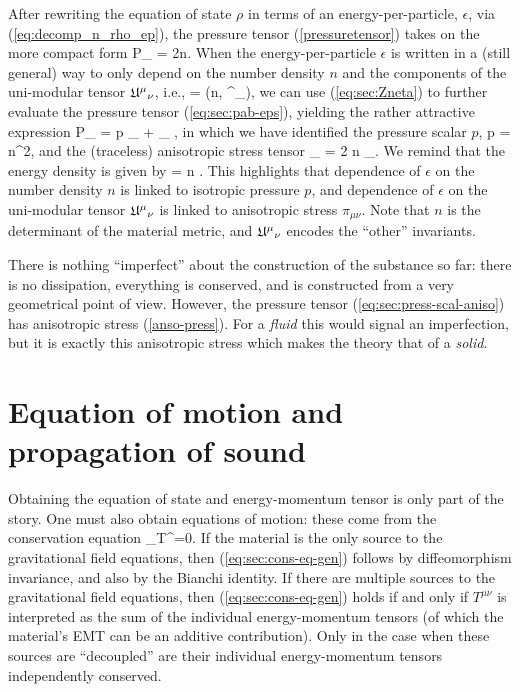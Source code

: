 

After rewriting the equation of state $\rho$ in terms of an energy-per-particle, $\epsilon$, via (\ref{eq:decomp_n_rho_ep}),  the pressure tensor (\ref{pressuretensor}) takes on  the more compact form
\bea
\label{eq:sec:pab-eps}
P_{\mu\nu} = 2n.
\eea
When the energy-per-particle $\epsilon$ is written in a (still general) way to only depend on the number density $n$ and the components of the  uni-modular tensor ${\mathfrak{U}^{\mu}}_{\nu}$, i.e., 
\bea
\epsilon = \epsilon(n, {\unimod^{\mu}}_{\nu}),
\eea
we can use (\ref{eq:sec:Zneta}) to further evaluate the pressure tensor (\ref{eq:sec:pab-eps}), yielding the rather attractive expression
\bea
\label{eq:sec:press-scal-aniso}
P_{\mu\nu} = p \gamma_{\mu\nu} + \pi_{\mu\nu} ,
\eea
in which  we have identified the pressure scalar $p$,
\bse
\bea
\label{iso-ess}
p = n^2,
\eea
and the (traceless) anisotropic stress tensor
\bea
\label{anso-press}
\pi_{\mu\nu} = 2 n \unimod_{\alpha\langle \mu}\pd{\epsilon}{{\unimod^{\nu\rangle}}_\alpha}.
\eea
We remind that the energy density is given by
\bea
\rho = n \epsilon.
\eea
\ese
This highlights that dependence of $\epsilon$ on the number density $n$ is linked to isotropic pressure $p$, and dependence of $\epsilon$ on the uni-modular tensor ${\mathfrak{U}^{\mu}}_{\nu}$ is linked to anisotropic stress $\pi_{\mu\nu}$. Note that $n$ is the determinant of the material metric, and ${\mathfrak{U}^{\mu}}_{\nu}$ encodes the ``other'' invariants.

There is nothing ``imperfect'' about the construction of the substance so far: there is no dissipation,   everything is conserved, and is constructed from a very geometrical point of view. However, the pressure tensor (\ref{eq:sec:press-scal-aniso}) has anisotropic stress (\ref{anso-press}). For a \textit{fluid} this would signal an imperfection, but it is exactly this anisotropic stress which makes the theory  that of a  \textit{solid}.




\section{Equation of motion and propagation of sound}
Obtaining the equation of state and energy-momentum tensor is   only part of the story. One must also obtain equations of motion: these come from the conservation equation
\bea
\label{eq:sec:cons-eq-gen}
\nabla_{\mu}T^{\mu\nu}=0.
\eea
If the material is the only source to the gravitational field equations, then (\ref{eq:sec:cons-eq-gen}) follows by diffeomorphism invariance, and also by the Bianchi identity. If there are multiple sources to the gravitational field equations, then (\ref{eq:sec:cons-eq-gen}) holds if and only if $T^{\mu\nu}$ is interpreted as the sum of the individual energy-momentum tensors (of which the material's EMT can be an additive contribution). Only in  the case when these sources are ``decoupled'' are their individual energy-momentum tensors  independently conserved.

